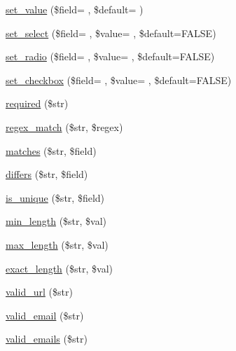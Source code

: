 \begin{DoxyCompactItemize}
\hyperlink{class_c_i___form__validation_aaa70eb02beedeae55d7cfb37462f23a5}{set\+\_\+value} (\$field= \textquotesingle{}\textquotesingle{}, \$default= \textquotesingle{}\textquotesingle{})
\item 
\hyperlink{class_c_i___form__validation_ac404077526153c2c3330cb00e47affd7}{set\+\_\+select} (\$field= \textquotesingle{}\textquotesingle{}, \$value= \textquotesingle{}\textquotesingle{}, \$default=F\+A\+L\+S\+E)
\item 
\hyperlink{class_c_i___form__validation_a3f76b822a246401c16949c8066dfea3c}{set\+\_\+radio} (\$field= \textquotesingle{}\textquotesingle{}, \$value= \textquotesingle{}\textquotesingle{}, \$default=F\+A\+L\+S\+E)
\item 
\hyperlink{class_c_i___form__validation_a1fe43ad49fc07563737e50922c90492b}{set\+\_\+checkbox} (\$field= \textquotesingle{}\textquotesingle{}, \$value= \textquotesingle{}\textquotesingle{}, \$default=F\+A\+L\+S\+E)
\item 
\hyperlink{class_c_i___form__validation_ada72eadfd041118d5f429a93dd0de07e}{required} (\$str)
\item 
\hyperlink{class_c_i___form__validation_acef19e29276dbdd2c69dffd5ec635600}{regex\+\_\+match} (\$str, \$regex)
\item 
\hyperlink{class_c_i___form__validation_aefdd25116835b684a2ab9ce6ef58d38c}{matches} (\$str, \$field)
\item 
\hyperlink{class_c_i___form__validation_aff14b601a3e51ef2323a4c241d81267e}{differs} (\$str, \$field)
\item 
\hyperlink{class_c_i___form__validation_a1a5ee6b60f419248ca8796444aea3a78}{is\+\_\+unique} (\$str, \$field)
\item 
\hyperlink{class_c_i___form__validation_a63a166f35fed88ec433fd2a37ec5ae90}{min\+\_\+length} (\$str, \$val)
\item 
\hyperlink{class_c_i___form__validation_a0896e538dd761148e6b3dfb0e033d344}{max\+\_\+length} (\$str, \$val)
\item 
\hyperlink{class_c_i___form__validation_a126edde2bb0ce82d7a202e340a61de9e}{exact\+\_\+length} (\$str, \$val)
\item 
\hyperlink{class_c_i___form__validation_a2879cd05a763105684cbad690e5cffd3}{valid\+\_\+url} (\$str)
\item 
\hyperlink{class_c_i___form__validation_af7d43edae9c6e388390176b3c62de140}{valid\+\_\+email} (\$str)
\item 
\hyperlink{class_c_i___form__validation_a7692019b59978c17621e3920823621c4}{valid\+\_\+emails} (\$str)

\end{DoxyCompactItemize}
